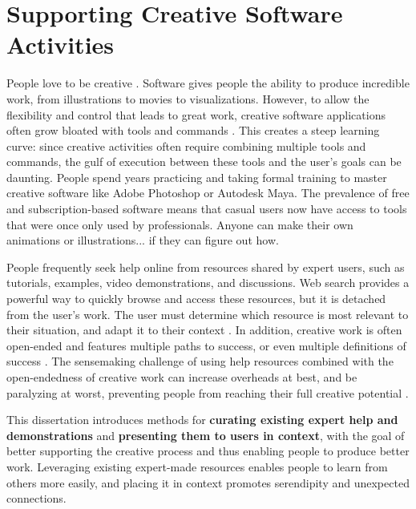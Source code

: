 \chapter{Supporting Creative Software Activities}
People love to be creative \cite{Shneiderman2002}. Software gives people the ability to produce incredible work, from illustrations to movies to visualizations. However, to allow the flexibility and control that leads to great work, creative software applications often grow bloated with tools and commands \cite{MM-gi2000}. This creates a steep learning curve: since creative activities often require combining multiple tools and commands, the gulf of execution \cite{Hutchins1985} between these tools and the user's goals can be daunting. People spend years practicing and taking formal training to master creative software like Adobe Photoshop or Autodesk Maya. The prevalence of free and subscription-based software means that casual users now have access to tools that were once only used by professionals. Anyone can make their own animations or illustrations... if they can figure out how.

People frequently seek help online from resources shared by expert users, such as tutorials, examples, video demonstrations, and discussions. Web search provides a powerful way to quickly browse and access these resources, but it is detached from the user's work. The user must determine which resource is most relevant to their situation, and adapt it to their context \cite{Ekstrand2011, Fourney2014Intertwine, Chilana2012, Lafreniere2014a}. In addition, creative work is often open-ended and features multiple paths to success, or even multiple definitions of success \cite{Shneiderman2007}. The sensemaking challenge of using help resources combined with the open-endedness of creative work can increase overheads at best, and be paralyzing at worst, preventing people from reaching their full creative potential \cite{Shneiderman2007}. 

This dissertation introduces methods for \textbf{curating existing expert help and demonstrations} and \textbf{presenting them to users in context}, with the goal of better supporting the creative process and thus enabling people to produce better work. Leveraging existing expert-made resources enables people to learn from others more easily, and placing it in context promotes serendipity and unexpected connections.

